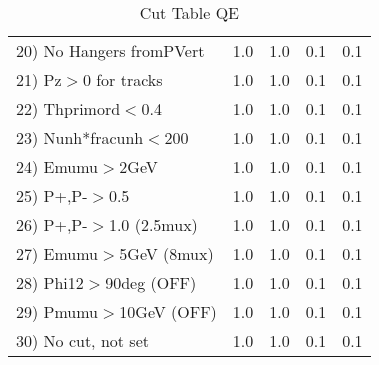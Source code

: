 \begin{table}[h!]
\begin{tabular}{||l||r|r|r|r||}
 20) No Hangers fromPVert &         1.0 &         1.0 &         0.1 &         0.1 \\
 21) Pz$>$0 for tracks    &         1.0 &         1.0 &         0.1 &         0.1 \\
 22) Thprimord$<$0.4      &         1.0 &         1.0 &         0.1 &         0.1 \\
 23) Nunh*fracunh$<$200   &         1.0 &         1.0 &         0.1 &         0.1 \\
 24) Emumu$>$2GeV         &         1.0 &         1.0 &         0.1 &         0.1 \\
 25) P+,P-$>$0.5          &         1.0 &         1.0 &         0.1 &         0.1 \\
 26) P+,P-$>$1.0 (2.5mux) &         1.0 &         1.0 &         0.1 &         0.1 \\
 27) Emumu$>$5GeV  (8mux) &         1.0 &         1.0 &         0.1 &         0.1 \\
 28) Phi12$>$90deg  (OFF) &         1.0 &         1.0 &         0.1 &         0.1 \\
 29) Pmumu$>$10GeV  (OFF) &         1.0 &         1.0 &         0.1 &         0.1 \\
 30) No cut, not set      &         1.0 &         1.0 &         0.1 &         0.1 \\
 \hline
 \hline
 \end{tabular}
 \caption{Cut Table  QE     }
 \label{tab-cut____qe}
 \end{table}
